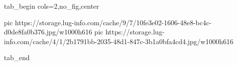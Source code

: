  
 
 
 
 

\ifcmt
  tab_begin cols=2,no_fig,center

     pic https://storage.lug-info.com/cache/9/7/10fe3e02-1606-48e8-bc4c-d0de8fa0b376.jpg/w1000h616
		 pic https://storage.lug-info.com/cache/4/1/2b1791bb-2035-48d1-847c-3b1a0bfa4cd4.jpg/w1000h616%

  tab_end
\fi
